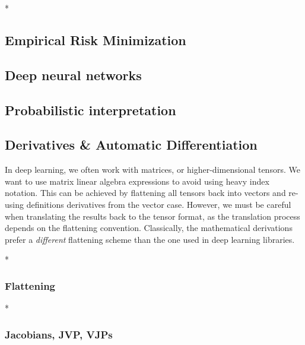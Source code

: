 \switchcolumn[1]*
\switchcolumn[0]

\subsection{Empirical Risk Minimization}


\switchcolumn[1]
\switchcolumn[0]

\subsection{Deep neural networks}


\subsection{Probabilistic interpretation}


\subsection{Derivatives \& Automatic Differentiation}

\begin{caveat}
  In deep learning, we often work with matrices, or higher-dimensional tensors.
  We want to use matrix linear algebra expressions to avoid using heavy index notation.
  This can be achieved by flattening all tensors back into vectors and re-using definitions derivatives from the vector case.
  However, we must be careful when translating the results back to the tensor format, as the translation process depends on the flattening convention.
  Classically, the mathematical derivations prefer a \emph{different} flattening scheme than the one used in deep learning libraries.
\end{caveat}

\switchcolumn[0]*
\subsubsection{Flattening}


\switchcolumn[0]*
\subsubsection{Jacobians, JVP, VJPs}


